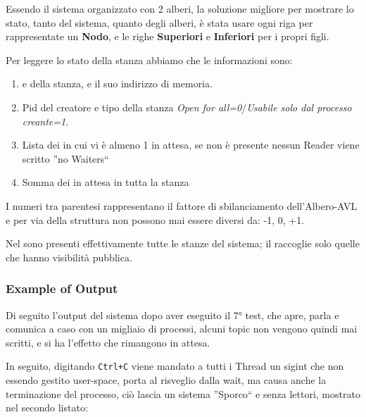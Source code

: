 Essendo il sistema organizzato con 2 alberi, la soluzione migliore per mostrare lo stato, tanto del sistema, quanto
degli alberi, è stata usare ogni riga per rappresentate un \textbf{Nodo}, e le righe \textbf{Superiori} e
\textbf{Inferiori} per i propri figli.

Per leggere lo stato della stanza abbiamo che le informazioni sono:
\begin{enumerate}
 \item \tagSys e \keySys della stanza, e il suo indirizzo di memoria.
 \item Pid del creatore e tipo della stanza \textit{Open for all=0}/\textit{Usabile solo dal processo creante=1}.
 \item Lista dei \Topic in cui vi è almeno 1 \Reader in attesa, se non è presente nessun Reader viene scritto ''no
Waiters``
 \item Somma dei \Reader in attesa in tutta la stanza
\end{enumerate}

I numeri tra parentesi rappresentano il fattore di sbilanciamento dell'Albero-AVL e per via della struttura non possono
mai essere diversi da: -1, 0, +1.

Nel \tagTree sono presenti effettivamente tutte le stanze del sistema; il \keyTree raccoglie solo quelle che hanno
visibilità pubblica.

\subsubsection{Example of Output}

Di seguito l'output del sistema dopo aver eseguito il 7° test, che apre, parla e comunica a caso con un migliaio di
processi, alcuni topic non vengono quindi mai scritti, e si ha l'effetto che rimangono in attesa.

In seguito, digitando \verb|Ctrl+C| viene mandato a tutti i Thread un sigint che non essendo gestito user-space, porta
al risveglio dalla wait, ma causa anche la terminazione del processo, ciò lascia un sistema ''Sporco`` e senza lettori,
mostrato nel secondo listato:

\newpage

